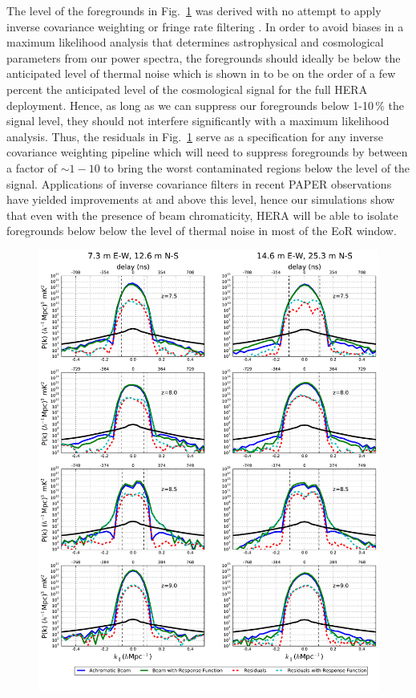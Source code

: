 \documentclass[twocolumn]{emulateapj}
\begin{document}
The level of the foregrounds in Fig.~\ref{fig:BothBaselines} was derived with no attempt to apply inverse covariance weighting \citep{Parsons:2014,Ali:2015} or fringe rate filtering \citep{Parsons:2015}. In order to avoid biases in a maximum likelihood analysis that determines astrophysical and cosmological parameters from our power spectra, the foregrounds should ideally be below the anticipated level of thermal noise which is shown in \citep{Pober:2014} to be on the order of a few percent the anticipated level of the cosmological signal for the full HERA deployment. Hence, as long as we can suppress our foregrounds below 1-10\,\% the signal level, they should not interfere significantly with a maximum likelihood analysis. Thus, the residuals in Fig.~\ref{fig:BothBaselines} serve as a specification for any inverse covariance weighting pipeline which will need to suppress foregrounds by between a factor of $\sim 1-10$ to bring the worst contaminated regions below the level of the signal. Applications of inverse covariance filters in recent PAPER observations have yielded improvements at and above this level, hence our simulations show that even with the presence of beam chromaticity, HERA will be able to isolate foregrounds below below the level of thermal noise in most of the EoR window. 

\begin{figure}
\includegraphics[width=\textwidth]{figures/ps_compare_nithya_bothBaselines.pdf}
\caption{}
\label{fig:BothBaselines}
\end{figure}
\end{document}
